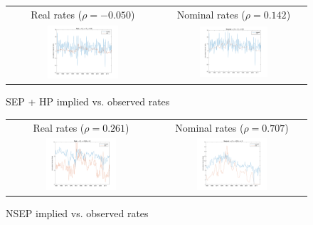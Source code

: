 \begin{figure}[h]
\ContinuedFloat*
\centering
\begin{tabular}{cc}
Real rates ($\rho = -0.050$) & Nominal rates ($\rho = 0.142$) \\
\includegraphics[width=0.49\textwidth]{figs/nipa/implied-vs-ffr/real_sep-hp} &
\includegraphics[width=0.49\textwidth]{figs/nipa/implied-vs-ffr/nominal_sep-hp}
\end{tabular}
\caption{SEP + HP implied vs. observed rates}
\label{implied-vs-ffr-nipa-others}
\end{figure}

\begin{figure}[h]
\ContinuedFloat
\centering
\begin{tabular}{cc}
Real rates ($\rho = 0.261$) & Nominal rates ($\rho = 0.707$) \\
\includegraphics[width=0.49\textwidth]{figs/nipa/implied-vs-ffr/real_nsep} &
\includegraphics[width=0.49\textwidth]{figs/nipa/implied-vs-ffr/nominal_nsep}
\end{tabular}
\caption{NSEP  implied vs. observed rates}
\end{figure}

